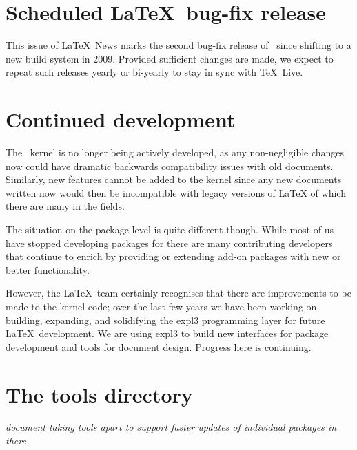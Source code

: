 \documentclass{ltnews}
\begin{document}
\maketitle

\section{Scheduled \LaTeX\ bug-fix release}

This issue of \LaTeX~News marks the second bug-fix release of
\LaTeXe\ since shifting to a new build system in 2009.
Provided sufficient changes are made, we expect to
repeat such releases yearly or bi-yearly to stay in sync with \TeX\ Live.

\section{Continued development}

\begin{itshape} %

The \LaTeXe\ kernel is no longer being actively developed, as any non-negligible changes now could have dramatic backwards compatibility issues with old documents. Similarly, new features cannot be added to the kernel since any new documents written now would then be incompatible with legacy versions of \LaTeX{} of which there are many in the fields.

The situation on the package level is quite different though. While most of us have stopped developing packages for \LaTeXe{} there are many contributing developers that continue to enrich \LaTeXe{} by providing or extending add-on packages with new or better functionality.

However, the \LaTeX\ team certainly recognises that there are improvements to be made to the kernel code; over the last few years we have been working on building, expanding, and solidifying the \textsf{expl3} programming layer for future \LaTeX\ development. We are using \textsf{expl3} to build new interfaces for package development and tools for document design. Progress here is continuing.

\end{itshape}


\section{The tools directory}

\textit{document taking tools apart to support faster updates of individual packages in there}
\end{document}
